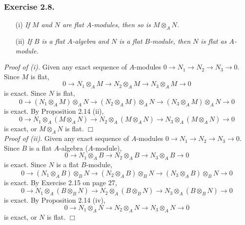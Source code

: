 \documentclass{article}
\begin{document}



\subsubsection*{Exercise 2.8.}
\begin{enumerate}
\item[(i)]
  \emph{If $M$ and $N$ are flat $A$-modules, then so is $M \otimes_{A} N$. }

\item[(ii)]
  \emph{If $B$ is a flat $A$-algebra and $N$ is a flat $B$-module,
  then $N$ is flat as $A$-module.} \\
\end{enumerate}



\emph{Proof of (i).}
Given any exact sequence of $A$-modules
$0 \to N_1 \to N_2 \to N_3 \to 0$.
Since $M$ is flat,
\[
  0 \to N_1 \otimes_{A} M \to N_2 \otimes_{A} M \to N_3 \otimes_{A} M \to 0
\]
is exact.
Since $N$ is flat,
\[
  0 \to (N_1 \otimes_{A} M) \otimes_{A} N
  \to (N_2 \otimes_{A} M) \otimes_{A} N
  \to (N_3 \otimes_{A} M) \otimes_{A} N \to 0
\]
is exact.
By Proposition 2.14 (ii),
\[
  0 \to N_1 \otimes_{A} (M \otimes_{A} N)
  \to N_2 \otimes_{A} (M \otimes_{A} N)
  \to N_3 \otimes_{A} (M \otimes_{A} N) \to 0
\]
is exact, or $M \otimes_{A} N$ is flat.
$\Box$ \\



\emph{Proof of (ii).}
Given any exact sequence of $A$-modules
$0 \to N_1 \to N_2 \to N_3 \to 0$.
Since $B$ is a flat $A$-algebra ($A$-module),
\[
  0 \to N_1 \otimes_{A} B \to N_2 \otimes_{A} B \to N_3 \otimes_{A} B \to 0
\]
is exact.
Since $N$ is a flat $B$-module,
\[
  0 \to (N_1 \otimes_{A} B) \otimes_{B} N
  \to (N_2 \otimes_{A} B) \otimes_{B} N
  \to (N_3 \otimes_{A} B) \otimes_{B} N \to 0
\]
is exact.
By Exercise 2.15 on page 27,
\[
  0 \to N_1 \otimes_{A} (B \otimes_{B} N)
  \to N_2 \otimes_{A} (B \otimes_{B} N)
  \to N_3 \otimes_{A} (B \otimes_{B} N) \to 0
\]
is exact.
By Proposition 2.14 (iv),
\[
  0 \to N_1 \otimes_{A} N
  \to N_2 \otimes_{A} N
  \to N_3 \otimes_{A} N \to 0
\]
is exact,
or $N$ is flat.
$\Box$ \\\\



\end{document}
